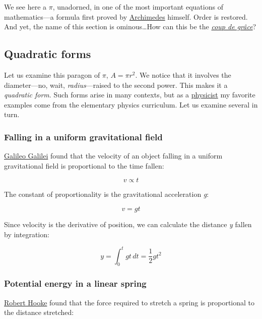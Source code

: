 \documentclass{article}
\begin{document}
\noindent We see here a $\pi$, unadorned, in one of the most important equations of mathematics---a formula first proved by \href{Archimedes}{Archimedes} himself. Order is restored. And yet, the name of this section is ominous\ldots How can this be the \href{http://en.wikipedia.org/wiki/Coup_de_grace}{\emph{coup de gr\^{a}ce}}?


  \subsection{Quadratic forms} %
  \label{sec:quadratic_forms}

Let us examine this paragon of $\pi$, $A = \pi r^2$. We notice that it involves the diameter---no, wait, \emph{radius}---raised to the second power. This makes it a \emph{quadratic form}. Such forms arise in many contexts, but as a \href{http://thesis.library.caltech.edu/1940/}{physicist} my favorite examples come from the elementary physics curriculum. Let us examine several in turn.

    \subsubsection{Falling in a uniform gravitational field} %
    \label{sec:falling_in_a_uniform_gravitational_field}

\href{http://en.wikipedia.org/wiki/Galileo_Galilei}{Galileo Galilei} found that the velocity of an object falling in a uniform gravitational field is proportional to the time fallen:

\[ v \propto t \]

\noindent The constant of proportionality is the gravitational acceleration \emph{g}:

\[ v = g t \]

\noindent Since velocity is the derivative of position, we can calculate the distance \emph{y} fallen by integration:

\[ y = \int_0^t gt\,dt = \textstyle{\frac{1}{2}} gt^2 \]


    \subsubsection{Potential energy in a linear spring} %
    \label{sec:potential_energy_in_a_linear_spring}

\href{http://en.wikipedia.org/wiki/Robert_Hooke}{Robert Hooke} found that the force required to stretch a spring is proportional to the distance stretched:
\end{document}
